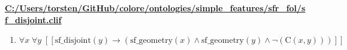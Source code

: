 \documentclass{article}
\begin{document}
\textbf{\url{C:/Users/torsten/GitHub/colore/ontologies/simple\_features/sfr\_fol/sf\_disjoint.clif}}

\begin{enumerate}
\item $\forall x\; \forall y\;  \left[ \left[ \textrm{sf\_disjoint}(y) \rightarrow \left(\textrm{sf\_geometry}(x) \land \textrm{sf\_geometry}(y) \land \neg \left(\textrm{C}(x,y)\right)\right) \right] \right]$
\end{enumerate}
\end{document}
